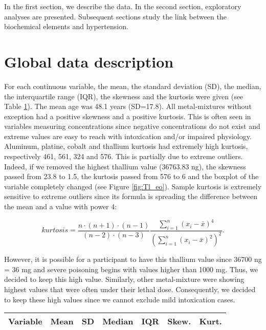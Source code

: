 
In the first section, we describe the data. In the second section, exploratory analyses are presented. Subsequent sections study the link between the biochemical elements and hypertension.

\section{Global data description}
For each continuous variable, the mean, the standard deviation (SD), the median, the interquartile range (IQR), the skewness and the kurtosis were given (see Table \ref{table:des_cont}). The mean age was 48.1 years (SD=17.8). All metal-mixtures without exception had a positive skewness and a positive kurtosis. This is often seen in variables measuring concentrations since negative concentrations do not exist and extreme values are easy to reach with intoxication and/or impaired physiology. Aluminum, platine, cobalt and thallium kurtosis had extremely high kurtosis, respectively 461, 561, 324 and 576. This is partially due to extreme outliers. Indeed, if we removed the highest thallium value (36763.83 ng), the skewness passed from 23.8 to 1.5, the kurtosis passed from 576 to 6 and the boxplot of the variable completely changed (see Figure \ref{fig:Tl_eo}). Sample kurtosis is extremely sensitive to extreme outliers since its formula is spreading the difference between the mean and a value with power 4:

\begin{equation*}
kurtosis=\frac{n\cdot(n+1)\cdot(n-1)}{(n-2)\cdot(n-3)} \frac{\sum_{i=1}^n (x_i- \bar{x})^4}{(\sum_{i=1}^n (x_i- \bar{x})^2)^2}.
\end{equation*}

However, it is possible for a participant to have this thallium value since 36700 ng = 36 mg and severe poisoning begins with values higher than 1000 mg. Thus, we decided to keep this high value. Similarly, other metal-mixture were showing highest values that were often under their lethal dose. Consequently, we decided to keep these high values since we cannot exclude mild intoxication cases.

\begin{table}
\centering
{}
\begin{adjustbox}{max width = 14cm}
\begin{tabular}{lrrrrrr}
\toprule
Variable & Mean & SD & Median & IQR & Skew. & Kurt. \\
\midrule

\bottomrule
\end{tabular}
\end{adjustbox}
\label{table:des_cont}
\end{table}

